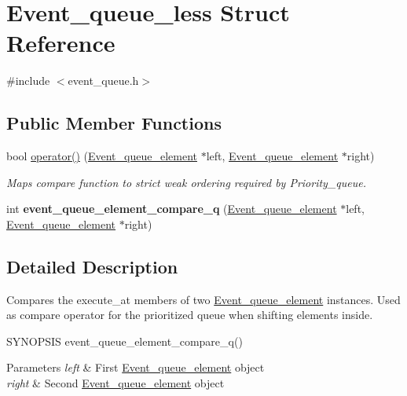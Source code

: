 \hypertarget{structEvent__queue__less}{}\section{Event\+\_\+queue\+\_\+less Struct Reference}
\label{structEvent__queue__less}


{\ttfamily \#include $<$event\+\_\+queue.\+h$>$}

\subsection*{Public Member Functions}
\begin{DoxyCompactItemize}
\item 
\mbox{\label{structEvent__queue__less_ad45c8d8cf773e3ff004a24829fad48b4}} 
bool \mbox{\hyperlink{structEvent__queue__less_ad45c8d8cf773e3ff004a24829fad48b4}{operator()}} (\mbox{\hyperlink{classEvent__queue__element}{Event\+\_\+queue\+\_\+element}} $\ast$left, \mbox{\hyperlink{classEvent__queue__element}{Event\+\_\+queue\+\_\+element}} $\ast$right)
\begin{DoxyCompactList}\small\item\em Maps compare function to strict weak ordering required by Priority\+\_\+queue. \end{DoxyCompactList}\item 
\mbox{\label{structEvent__queue__less_a6a21a49d7661975780b62dea9fadb7a9}} 
int {\bfseries event\+\_\+queue\+\_\+element\+\_\+compare\+\_\+q} (\mbox{\hyperlink{classEvent__queue__element}{Event\+\_\+queue\+\_\+element}} $\ast$left, \mbox{\hyperlink{classEvent__queue__element}{Event\+\_\+queue\+\_\+element}} $\ast$right)
\end{DoxyCompactItemize}


\subsection{Detailed Description}
Compares the execute\+\_\+at members of two \mbox{\hyperlink{classEvent__queue__element}{Event\+\_\+queue\+\_\+element}} instances. Used as compare operator for the prioritized queue when shifting elements inside.

S\+Y\+N\+O\+P\+S\+IS event\+\_\+queue\+\_\+element\+\_\+compare\+\_\+q() 
\begin{DoxyParams}{Parameters}
{\em left} & First \mbox{\hyperlink{classEvent__queue__element}{Event\+\_\+queue\+\_\+element}} object \\
\hline
{\em right} & Second \mbox{\hyperlink{classEvent__queue__element}{Event\+\_\+queue\+\_\+element}} object\\
\hline
\end{DoxyParams}

